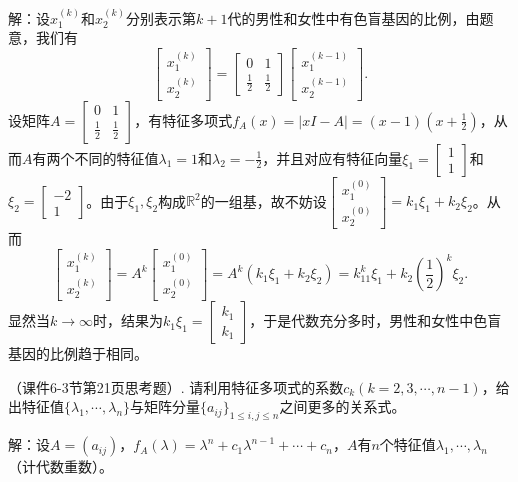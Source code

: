 \documentclass[10pt,twocolumn,letterpaper]{article}
\theoremstyle{mythmstyle}
\begin{document}
\noindent 解：设$x_1^{(k)}$和$x_2^{(k)}$分别表示第$k+1$代的男性和女性中有色盲基因的比例，由题意，我们有
\[\begin{bmatrix}x_1^{(k)} \\ x_2^{(k)}\end{bmatrix}
=\begin{bmatrix}0 & 1 \\ \frac{1}{2} & \frac{1}{2}\end{bmatrix}
\begin{bmatrix}x_1^{(k-1)} \\ x_2^{(k-1)}\end{bmatrix}.\]
设矩阵$A=\begin{bmatrix}0 & 1 \\ \frac{1}{2} & \frac{1}{2}\end{bmatrix}$，有特征多项式$f_A(x)=|xI-A|=(x-1)(x+\frac{1}{2})$，从而$A$有两个不同的特征值$\lambda_1=1$和$\lambda_2=-\frac{1}{2}$，并且对应有特征向量$\xi_1=\begin{bmatrix}1 \\ 1\end{bmatrix}$和$\xi_2=\begin{bmatrix}-2 \\ 1\end{bmatrix}$。由于$\xi_1,\xi_2$构成$\mathbb{R}^2$的一组基，故不妨设$\begin{bmatrix}x_1^{(0)} \\ x_2^{(0)}\end{bmatrix}=k_1\xi_1+k_2\xi_2$。从而
\[\begin{bmatrix}x_1^{(k)} \\ x_2^{(k)}\end{bmatrix}
=A^k\begin{bmatrix}x_1^{(0)} \\ x_2^{(0)}\end{bmatrix}
=A^k(k_1\xi_1+k_2\xi_2)
=k_11^k\xi_1+k_2(\frac{1}{2})^k\xi_2.\]
显然当$k\rightarrow\infty$时，结果为$k_1\xi_1=\begin{bmatrix}k_1 \\ k_1\end{bmatrix}$，于是代数充分多时，男性和女性中色盲基因的比例趋于相同。

\vspace{1em}
（课件6-3节第21页思考题）. 请利用特征多项式的系数$c_k(k=2,3,\cdots,n-1)$，给出特征值$\{\lambda_1,\cdots,\lambda_n\}$与矩阵分量$\{a_{ij}\}_{1\leqslant i,j\leqslant n}$之间更多的关系式。

\noindent 解：设$A=(a_{ij})$，$f_A(\lambda)=\lambda^n+c_1\lambda^{n-1}+\cdots+c_n$，$A$有$n$个特征值$\lambda_1,\cdots,\lambda_n$（计代数重数）。
\end{document}
